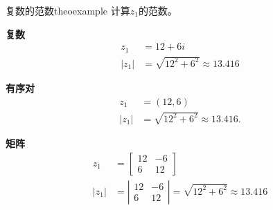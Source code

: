 \begin{myexample}{复数的范数}{theoexample}
计算$z_{1}$的范数。

\textbf{复数}
$$
  \begin{aligned}
    z_{1}              & =12+6 i                             \\
    \left|z_{1}\right| & =\sqrt{12^{2}+6^{2}} \approx 13.416
  \end{aligned}
$$

\textbf{有序对}
$$
  \begin{aligned}
    z_{1}              & =(12,6)                               \\
    \left|z_{1}\right| & =\sqrt{12^{2}+6^{2}} \approx 13.416 .
  \end{aligned}
$$

\textbf{矩阵}
$$
  \begin{aligned}
    z_{1}              & =\left[\begin{array}{cc}
        12 & -6 \\
        6  & 12
      \end{array}\right]                                    \\
    \left|z_{1}\right| & =\left|\begin{array}{cc}
      12 & -6 \\
      6  & 12
    \end{array}\right|=\sqrt{12^{2}+6^{2}} \approx 13.416
  \end{aligned}
$$
\end{myexample}

